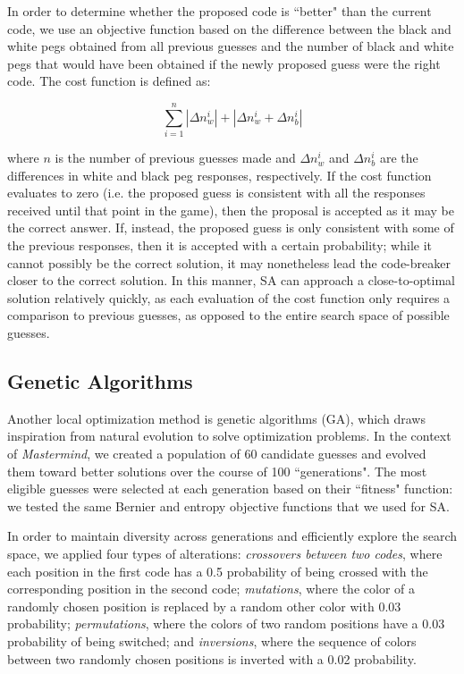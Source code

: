 \documentclass[11pt]{article}
\begin{document}
In order to determine whether the proposed code is ``better" than the current code, we use an objective function based on the difference between the black and white pegs obtained from all previous guesses and the number of black and white pegs that would have been obtained if the newly proposed guess were the right code. The cost function is defined as:

\[
\sum_{i=1}^n | \Delta n_w^i | + | \Delta n_w^i + \Delta n_b^i |
\]

\noindent where $n$ is the number of previous guesses made and $\Delta n_w^i $ and $\Delta n_b^i$ are the differences in white and black peg responses, respectively. If the cost function evaluates to zero (i.e. the proposed guess is consistent with all the responses received until that point in the game), then the proposal is accepted as it may be the correct answer. If, instead, the proposed guess is only consistent with some of the previous responses, then it is accepted with a certain probability; while it cannot possibly be the correct solution, it may nonetheless lead the code-breaker closer to the correct solution. In this manner, SA can approach a close-to-optimal solution relatively quickly, as each evaluation of the cost function only requires a comparison to previous guesses, as opposed to the entire search space of possible guesses.

\subsection{Genetic Algorithms}

Another local optimization method is genetic algorithms (GA), which draws inspiration from natural evolution to solve optimization problems. In the context of \textit{Mastermind}, we created a population of 60 candidate guesses and evolved them toward better solutions over the course of 100 ``generations". The most eligible guesses were selected at each generation based on their ``fitness" function: we tested the same Bernier and entropy objective functions that we used for SA.

\newpage

In order to maintain diversity across generations and efficiently explore the search space, we applied four types of alterations: \textit{crossovers between two codes}, where each position in the first code has a 0.5 probability of being crossed with the corresponding position in the second code; \textit{mutations}, where the color of a randomly chosen position is replaced by a random other color with 0.03 probability; \textit{permutations}, where the colors of two random positions have a 0.03 probability of being switched; and \textit{inversions}, where the sequence of colors between two randomly chosen positions is inverted with a 0.02 probability.
\end{document}
